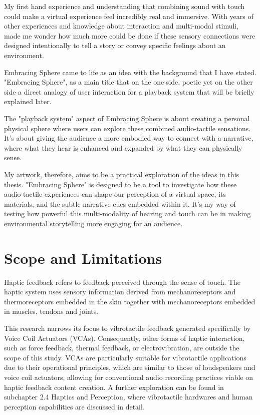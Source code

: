     My first hand experience and understanding that combining sound with touch could make a virtual experience feel incredibly real and immersive. With years of other experiences and knowledge about interaction and multi-modal stimuli, made me wonder how much more could be done if these sensory connections were designed intentionally to tell a story or convey specific feelings about an environment.\par

    Embracing Sphere came to life as an idea with the background that I have stated. "Embracing Sphere", as a main title that on the one side, poetic yet on the other side a direct analogy of user interaction for a playback system that will be briefly explained later.\par
    
    The "playback system" aspect of Embracing Sphere is about creating a personal physical sphere where users can explore these combined audio-tactile sensations. It's about giving the audience a more embodied way to connect with a narrative, where what they hear is enhanced and expanded by what they can physically sense.\par
    
    My artwork, therefore, aims to be a practical exploration of the ideas in this thesis. "Embracing Sphere" is designed to be a tool to investigate how these audio-tactile experiences can shape our perception of a virtual space, its materials, and the subtle narrative cues embedded within it. It’s my way of testing how powerful this multi-modality of hearing and touch can be in making environmental storytelling more engaging for an audience.\par

    \section{Scope and Limitations}
    Haptic feedback refers to feedback perceived through the sense of touch. The haptic system uses sensory information derived from mechanoreceptors and thermoreceptors embedded in the skin together with mechanoreceptors embedded in muscles, tendons and joints\cite{Haptic_Perception-A_Tutorial}.\par 

    This research narrows its focus to vibrotactile feedback generated specifically by Voice Coil Actuators (VCAs). Consequently, other forms of haptic interaction, such as force feedback, thermal feedback, or electrovibration, are outside the scope of this study. VCAs are particularly suitable for vibrotactile applications due to their operational principles, which are similar to those of loudspeakers and voice coil actuators\cite{Audio-Tactile_Rendering}, allowing for conventional audio recording practices viable on haptic feedback content creation. A further exploration can be found in subchapter 2.4 Haptics and Perception, where vibrotactile hardwares and human perception capabilities are discussed in detail.\par 

